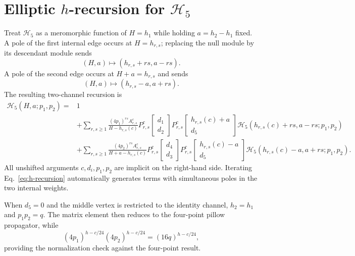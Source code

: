 \documentclass[11pt]{article}
\newcommand{\cH}{\mathcal H}
\begin{document}
\section{Elliptic \texorpdfstring{$h$}{h}-recursion for
\texorpdfstring{$\cH_5$}{H5}}

Treat $\cH_5$ as a meromorphic function of $H=h_1$ while holding
$a=h_2-h_1$ fixed.  A pole of the first internal edge occurs at
$H=h_{r,s}$; replacing the null module by its descendant module sends
\begin{equation}
 (H,a)\longmapsto(h_{r,s}+rs,a-rs).
 \label{eq:first-shift}
\end{equation}
A pole of the second edge occurs at $H+a=h_{r,s}$ and sends
\begin{equation}
 (H,a)\longmapsto(h_{r,s}-a,a+rs).
 \label{eq:second-shift}
\end{equation}
The resulting two-channel recursion is
\begin{equation}
\boxed{
\begin{aligned}
 \cH_5(H,a;p_1,p_2)
={}&1\\
&+\sum_{r,s\geq1}
 \frac{(4p_1)^{rs}A_{r,s}^{c}}
      {H-h_{r,s}(c)}
 P_{r,s}^{c}\!\begin{bmatrix}d_1\\d_2\end{bmatrix}
 P_{r,s}^{c}\!\begin{bmatrix}h_{r,s}(c)+a\\d_5\end{bmatrix}
 \cH_5\!\left(h_{r,s}(c)+rs,a-rs;p_1,p_2\right)
 \\
&+\sum_{r,s\geq1}
 \frac{(4p_2)^{rs}A_{r,s}^{c}}
      {H+a-h_{r,s}(c)}
 P_{r,s}^{c}\!\begin{bmatrix}d_4\\d_3\end{bmatrix}
 P_{r,s}^{c}\!\begin{bmatrix}h_{r,s}(c)-a\\d_5\end{bmatrix}
 \cH_5\!\left(h_{r,s}(c)-a,a+rs;p_1,p_2\right).
\end{aligned}}
\label{eq:h-recursion}
\end{equation}
All unshifted arguments $c,d_i,p_1,p_2$ are implicit on the right-hand
side.  Iterating Eq.~\eqref{eq:h-recursion} automatically generates terms
with simultaneous poles in the two internal weights.

When $d_5=0$ and the middle vertex is restricted to the identity channel,
$h_2=h_1$ and $p_1p_2=q$.  The matrix element then reduces to the
four-point pillow propagator, while
\begin{equation}
 (4p_1)^{h-c/24}(4p_2)^{h-c/24}
 =(16q)^{h-c/24},
\end{equation}
providing the normalization check against the four-point result.
\end{document}
